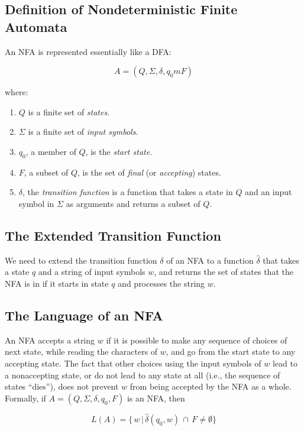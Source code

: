 \documentclass[]{article}
\begin{document}
  \subsection*{Definition of Nondeterministic Finite Automata}
    An NFA is represented essentially like a DFA:

      \[ A = (Q, \Sigma, \delta, q_0m F) \]

    where:
      \begin{enumerate}
        \item $Q$ is a finite set of \emph{states}.
        \item $\Sigma$ is a finite set of \emph{input symbols}.
        \item $q_0$, a member of $Q$, is the \emph{start state}.
        \item $F$, a subset of $Q$, is the set of \emph{final} (or
        \emph{accepting}) states.
        \item $\delta$, the \emph{transition function} is a function that
        takes a state in $Q$ and an input symbol in $\Sigma$ as arguments and
        returns a subset of $Q$.
      \end{enumerate}

  \subsection*{The Extended Transition Function}
    We need to extend the transition function $\delta$ of an NFA to a function
    $\hat{\delta}$ that takes a state $q$ and a string of input symbols $w$,
    and returns the set of states that the NFA is in if it starts in state $q$
    and processes the string $w$.

  \subsection*{The Language of an NFA}
    An NFA accepts a string $w$ if it is possible to make any sequence of
    choices of next state, while reading the characters of $w$, and go from
    the start state to any accepting state. The fact that other choices using
    the input symbols of $w$ lead to a nonaccepting state, or do not lead to
    any state at all (i.e., the sequence of states ``dies''), does not prevent
    $w$ from being accepted by the NFA as a whole. Formally, if $A = (Q,
    \Sigma, \delta, q_0, F)$ is an NFA, then

      \[
        L(A) = \{ \, w \, | \, \hat{\delta}(q_0, w) \, \cap \, F \neq
        \emptyset \}
      \]
\end{document}
